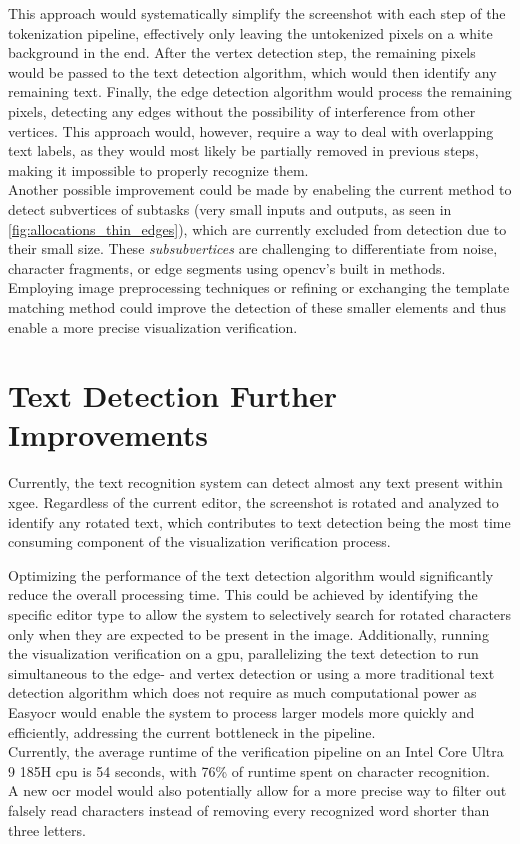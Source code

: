 This approach would systematically simplify the screenshot with each step of the tokenization pipeline, effectively only leaving the untokenized pixels on a white background in the end. After the vertex detection step, the remaining pixels would be passed to the text detection algorithm, which would then identify any remaining text. Finally, the edge detection algorithm would process the remaining pixels, detecting any edges without the possibility of interference from other vertices. This approach would, however, require a way to deal with overlapping text labels, as they would most likely be partially removed in previous steps, making it impossible to properly recognize them.\\

Another possible improvement could be made by enabeling the current method to detect subvertices of subtasks (very small inputs and outputs, as seen in \autoref{fig:allocations_thin_edges}), which are currently excluded from detection due to their small size. These \textit{subsubvertices} are challenging to differentiate from noise, character fragments, or edge segments using \acrshort{opencv}'s built in methods. Employing image preprocessing techniques or refining or exchanging the template matching method could improve the detection of these smaller elements and thus enable a more precise visualization verification.

\section{Text Detection Further Improvements}
\label{sec:text_detection_future_improvements}
Currently, the text recognition system can detect almost any text present within \acrshort{xgee}. Regardless of the current editor, the screenshot is rotated and analyzed to identify any rotated text, which contributes to text detection being the most time consuming component of the visualization verification process.

Optimizing the performance of the text detection algorithm would significantly reduce the overall processing time. This could be achieved by identifying the specific editor type to allow the system to selectively search for rotated characters only when they are expected to be present in the image. Additionally, running the visualization verification on a \acrshort{gpu}, parallelizing the text detection to run simultaneous to the edge- and vertex detection or using a more traditional text detection algorithm which does not require as much computational power as Easy\acrshort{ocr} would enable the system to process larger models more quickly and efficiently, addressing the current bottleneck in the pipeline.\\
Currently, the average runtime of the verification pipeline on an Intel Core Ultra 9 185H \acrshort{cpu} is 54 seconds, with 76\% of runtime spent on character recognition.\\
A new \acrshort{ocr} model would also potentially allow for a more precise way to filter out falsely read characters instead of removing every recognized word shorter than three letters.


